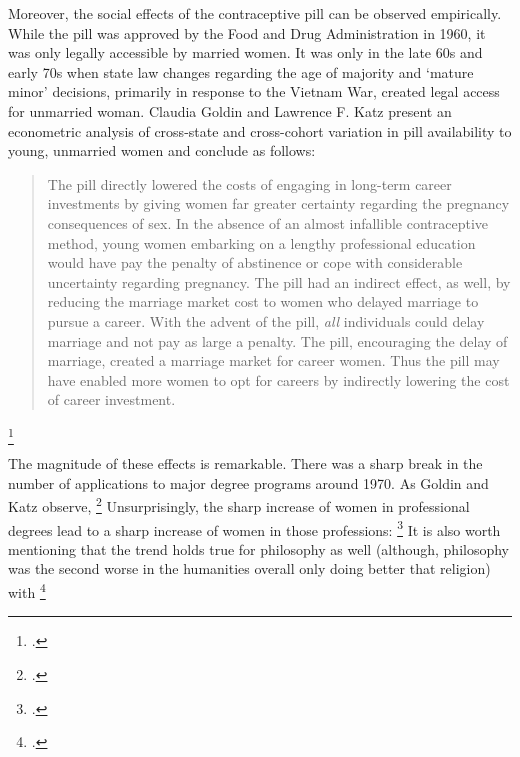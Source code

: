 \documentclass[letterpaper,notitlepage,12pt]{article}
\begin{document}
Moreover, the social effects of the contraceptive pill can be observed
empirically.
While the pill was approved by the Food and Drug Administration in 1960, it was
only legally accessible by married women.
It was only in the late 60s and early 70s when state law changes regarding the
age of majority and `mature minor' decisions, primarily in response to the
Vietnam War, created legal access for unmarried woman.
Claudia Goldin and Lawrence F. Katz present an econometric analysis of
cross-state and cross-cohort variation in pill availability to young, unmarried
women and conclude as follows:
\blockquote{The pill directly lowered the costs of engaging in long-term career
  investments by giving women far greater certainty regarding the pregnancy
consequences of sex. In the absence of an almost infallible contraceptive
method, young women embarking on a lengthy professional education would have pay
the penalty of abstinence or cope with considerable uncertainty regarding
pregnancy. The pill had an indirect effect, as well, by reducing the marriage
market cost to women who delayed marriage to pursue a career. With the advent of
the pill, \textit{all} individuals could delay marriage and not pay as large a
penalty. The pill, encouraging the delay of marriage, created a
 marriage market for career women. Thus the pill may have
enabled more women to opt for careers by indirectly lowering the cost of career
investment.}\footcite[p. 731]{goldin_power_2002}

The magnitude of these effects is remarkable.
There was a sharp break in the number of applications to major degree programs
around 1970.
As Goldin and Katz observe, \footcite[p.
749]{goldin_power_2002}
Unsurprisingly, the sharp increase of women in professional degrees lead to a
sharp increase of women in those professions: \footcite[p. 749]{goldin_power_2002}
It is also worth mentioning that the trend holds true for philosophy as well
(although, philosophy was the second worse in the humanities
overall only doing better that religion) with \footcite[p.
683]{rorty_special_1987}
\end{document}

